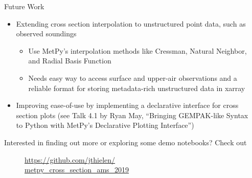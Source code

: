 \documentclass[final]{beamer}
\newlength{\sepwidth}
\newlength{\colwidth}
\newcommand{\separatorcolumn}{\begin{column}{\sepwidth}\end{column}}
\begin{document}
\begin{frame}[t, fragile]
\begin{columns}[t]
\begin{column}{\colwidth}
  \begin{block}{Future Work}

    \begin{itemize}
      \item Extending cross section interpolation to unstructured point data, such as observed soundings
        \begin{itemize}
          \item Use MetPy's interpolation methods like Cressman, Natural Neighbor, and Radial Basis Function
          \item Needs easy way to access surface and upper-air observations and a reliable format for storing metadata-rich unstructured data in xarray
        \end{itemize}
      \item Improving ease-of-use by implementing a declarative interface for cross section plots (see Talk 4.1 by Ryan May, ``Bringing GEMPAK-like Syntax to Python with MetPy's Declarative Plotting Interface'')
    \end{itemize}

    \vspace{0.5em} 

    Interested in finding out more or exploring some demo notebooks? Check out

    \vspace{0.25em} 

    \begin{figure}
      \centering
      \large{\url{https://github.com/jthielen/}\\ \url{metpy_cross_section_ams_2019}}

      \vspace{0.5em}

    \end{figure}

  \end{block}

\end{column}

\separatorcolumn
\end{columns}
\end{frame}
\end{document}
